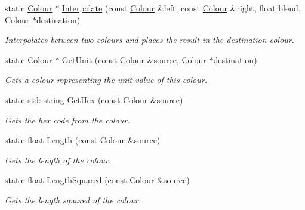 \begin{DoxyCompactItemize}
static \hyperlink{class_flounder_1_1_colour}{Colour} $\ast$ \hyperlink{class_flounder_1_1_colour_ab239c66801a06621595745c63e1c64a2}{Interpolate} (const \hyperlink{class_flounder_1_1_colour}{Colour} \&left, const \hyperlink{class_flounder_1_1_colour}{Colour} \&right, float blend, \hyperlink{class_flounder_1_1_colour}{Colour} $\ast$destination)
\begin{DoxyCompactList}\small\item\em Interpolates between two colours and places the result in the destination colour. \end{DoxyCompactList}\item 
static \hyperlink{class_flounder_1_1_colour}{Colour} $\ast$ \hyperlink{class_flounder_1_1_colour_a3c2caae7bfb88e90349f1147e3e2b924}{Get\+Unit} (const \hyperlink{class_flounder_1_1_colour}{Colour} \&source, \hyperlink{class_flounder_1_1_colour}{Colour} $\ast$destination)
\begin{DoxyCompactList}\small\item\em Gets a colour representing the unit value of this colour. \end{DoxyCompactList}\item 
static std\+::string \hyperlink{class_flounder_1_1_colour_ad4578de486d8c375a949ef62a165d043}{Get\+Hex} (const \hyperlink{class_flounder_1_1_colour}{Colour} \&source)
\begin{DoxyCompactList}\small\item\em Gets the hex code from the colour. \end{DoxyCompactList}\item 
static float \hyperlink{class_flounder_1_1_colour_a374401ca82651a558dd5786ebffc2512}{Length} (const \hyperlink{class_flounder_1_1_colour}{Colour} \&source)
\begin{DoxyCompactList}\small\item\em Gets the length of the colour. \end{DoxyCompactList}\item 
static float \hyperlink{class_flounder_1_1_colour_a5f016f570b13c76c3ac6f4b0ccc901d2}{Length\+Squared} (const \hyperlink{class_flounder_1_1_colour}{Colour} \&source)
\begin{DoxyCompactList}\small\item\em Gets the length squared of the colour. \end{DoxyCompactList}\end{DoxyCompactItemize}
